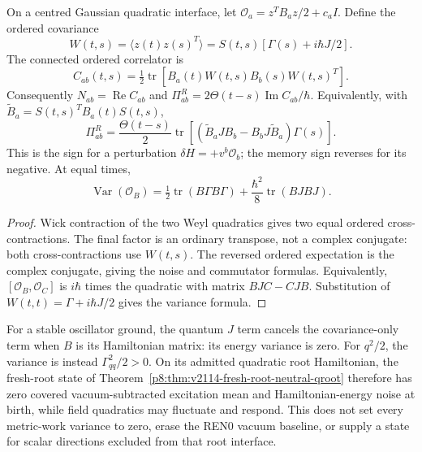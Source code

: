 \documentclass[12pt,a4paper]{article}
\begin{document}
\begin{proposition}
\label{p4:prop:v2203-gaussian-connected-noise}
On a centred Gaussian quadratic interface, let
\(\mathcal O_a=z^TB_az/2+c_aI\).  Define the ordered covariance
\[
 W(t,s)=\langle z(t)z(s)^T\rangle
 =S(t,s)[\Gamma(s)+i\hbar J/2].
\]
The connected ordered correlator is
\[
 \boxed{C_{ab}(t,s)
 =\tfrac12\operatorname{tr}
 [B_a(t)W(t,s)B_b(s)W(t,s)^T].}
\]
Consequently \(N_{ab}=\operatorname{Re}C_{ab}\) and
\(\Pi^R_{ab}=2\Theta(t-s)\operatorname{Im}C_{ab}/\hbar\).
Equivalently, with
\(\widetilde B_a=S(t,s)^TB_a(t)S(t,s)\),
\[
 \Pi^R_{ab}=\frac{\Theta(t-s)}2\operatorname{tr}
 [(\widetilde B_aJB_b-B_bJ\widetilde B_a)\Gamma(s)].
\]
This is the sign for a perturbation \(\delta H=+v^b\mathcal O_b\);
the memory sign reverses for its negative.
At equal times,
\[
 \boxed{\operatorname{Var}(\mathcal O_B)
 =\tfrac12\operatorname{tr}(B\Gamma B\Gamma)
  +\frac{\hbar^2}{8}\operatorname{tr}(BJBJ).}
\]
\end{proposition}
\begin{proof}
Wick contraction of the two Weyl quadratics gives two equal ordered
cross-contractions.  The final factor is an ordinary transpose, not a
complex conjugate: both cross-contractions use \(W(t,s)\).
The reversed ordered expectation is the complex conjugate, giving the
noise and commutator formulas.  Equivalently,
\([\mathcal O_B,\mathcal O_C]\) is \(i\hbar\) times the quadratic
with matrix \(BJC-CJB\).  Substitution of
\(W(t,t)=\Gamma+i\hbar J/2\) gives the variance formula.
\end{proof}
For a stable oscillator ground, the quantum \(J\) term cancels the
covariance-only term when \(B\) is its Hamiltonian matrix: its energy
variance is zero.  For \(q^2/2\), the variance is instead
\(\Gamma_{qq}^2/2>0\).  On its admitted quadratic root Hamiltonian,
the fresh-root state of
Theorem~\ref{p8:thm:v2114-fresh-root-neutral-qroot} therefore has zero
covered vacuum-subtracted excitation mean and Hamiltonian-energy noise
at birth, while field quadratics may fluctuate and respond.  This does
not set every metric-work variance to zero, erase the REN0 vacuum
baseline, or supply a state for scalar directions excluded from that
root interface.
\end{document}
